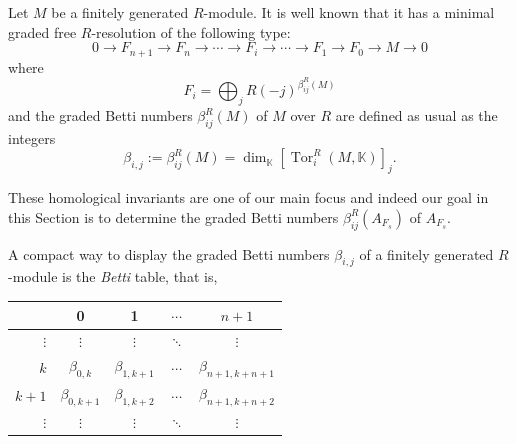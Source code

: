 \documentclass[12pt,twoside]{amsart}
\numberwithin{equation}{section} \hyphenation{semi-stable}
\newcommand{\K}{\mathbb{K}}
\DeclareMathOperator{\Tor}{Tor}
\theoremstyle{definition}
\begin{document}
 Let $M$ be a finitely generated  $R$-module. It is well known that it has a minimal graded free $R$-resolution of the following type:
$$
0\longrightarrow F_{n+1} 
\longrightarrow F_n \longrightarrow \cdots  \longrightarrow F_i \longrightarrow \cdots \longrightarrow F_1\longrightarrow  F_0\longrightarrow M\longrightarrow 0 
$$
where
$$ F_i=\bigoplus _jR(-j)^{\beta_{ij}^R(M)}
$$
and the graded Betti numbers $\beta_{ij}^R(M)$ of $M$ over $R$ are defined as usual as  the integers
$$
\beta_{i,j}:=\beta_{ij}^R(M)=\dim_\K [\Tor^R_i(M,\K)]_j.
$$ 

These homological invariants are one of  our main focus and indeed our goal in this Section is to determine the graded Betti numbers $\beta _{ij}^R(A_{F_s})$ of $A_{F_s}$.

 A compact way to display the graded Betti numbers $\beta _{i,j}$  of a finitely generated $R$-module is the {\em Betti} table, that is,

    \vskip 4mm
    
    \begin{center}
    \begin{tabular}{ r | c c c c}
           &  0 &  1 &  $\cdots$ & $n+1$ \\
    \hline
     $\vdots$ &  $\vdots$ &  $\vdots$ & $\ddots$ & $\vdots$ \\
       $k$ &  $\beta_{0, k}$ & $\beta_{1, k+1}$ & $\cdots$ &  $\beta_{n + 1, k +n+1}$ \\ 
      $k+1$ &  $\beta_{0, k+1}$ & $\beta_{1, k+2}$ & $\cdots$ & $\beta_{n + 1,k+n+2}$ \\
 $\vdots$ &  $\vdots$ &  $\vdots$ & $\ddots$ & $\vdots$ \\
    \end{tabular}
    \end{center}
\end{document}
